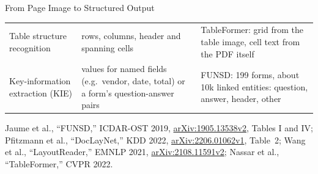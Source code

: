 \begin{frame}{From Page Image to Structured Output}
{\begin{tabular}{>{\raggedright\arraybackslash}p{2.5cm} >{\raggedright\arraybackslash}p{4.6cm} >{\raggedright\arraybackslash}p{4.8cm}}
    Table structure recognition & rows, columns, header and spanning cells & TableFormer: grid from the table image, cell text from the PDF itself \\
    \addlinespace[0.15em]
    Key-information extraction (KIE) & values for named fields (e.g.\ vendor, date, total) or a form's question-answer pairs & FUNSD: 199 forms, about 10k linked entities: question, answer, header, other \\
    \bottomrule
  \end{tabular}\par}
  \vspace{0.2em}
  {\scriptsize Jaume et al., ``FUNSD,'' ICDAR-OST 2019, \href{https://arxiv.org/abs/1905.13538v2}{arXiv:1905.13538v2}, Tables I and IV; Pfitzmann et al., ``DocLayNet,'' KDD 2022, \href{https://arxiv.org/abs/2206.01062v1}{arXiv:2206.01062v1}, Table~2; Wang et al., ``LayoutReader,'' EMNLP 2021, \href{https://arxiv.org/abs/2108.11591v2}{arXiv:2108.11591v2}; Nassar et al., ``TableFormer,'' CVPR 2022.\par}
\end{frame}

